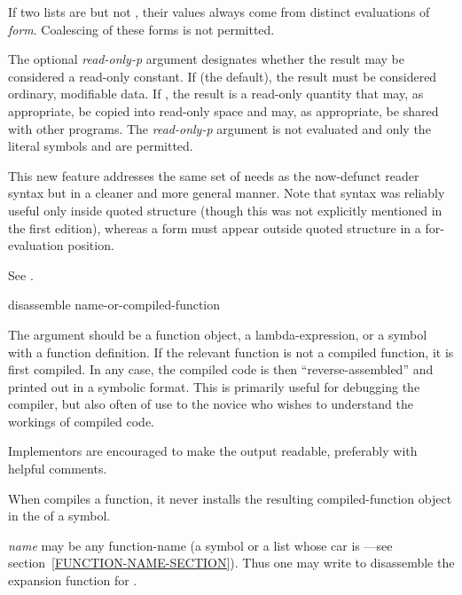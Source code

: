 \begin{defspec}
  If two lists  are  but not , their
  values always come from distinct evaluations of \emph{form}.  Coalescing
  of these forms is not permitted.

  The optional \emph{read-only-p} argument designates whether the result
  may be considered a
  read-only constant. If  (the default), the result must be considered
  ordinary, modifiable data. If , the result is a read-only quantity
  that may, as appropriate, be copied into read-only space and may,
  as appropriate, be shared
  with other programs.  The \emph{read-only-p} argument is
  not evaluated and only the literal symbols  and  are permitted.

  This new feature addresses the same set of needs as the now-defunct
  \cd{\#,} reader syntax but in a cleaner and more general manner.
  Note that \cd{\#,} syntax was reliably useful only inside quoted structure
  (though this was not explicitly mentioned in the first edition),
  whereas a  form must appear outside quoted structure in a
  for-evaluation position.

  See .
\end{defspec}


\begin{defun}[Function]
disassemble name-or-compiled-function

The argument should be a function object, a lambda-expression, or
a symbol with a function definition.  If the relevant function is not a
compiled function, it is first compiled.  In any case, the compiled code
is then ``reverse-assembled'' and printed out in a symbolic format.  This
is primarily useful for debugging the compiler, but also often of use to
the novice who wishes to understand the workings of compiled code.

\beforenoterule
\begin{implementation}
Implementors are encouraged to make the output
readable, preferably with helpful comments.
\end{implementation}
\afternoterule

When  compiles a function, it never
installs the resulting compiled-function object in the
 of a symbol.

\emph{name} may be any function-name (a symbol or a list
whose car is ---see section~\ref{FUNCTION-NAME-SECTION}).
Thus one may write  to disassemble the 
expansion function for .
\end{defun}

